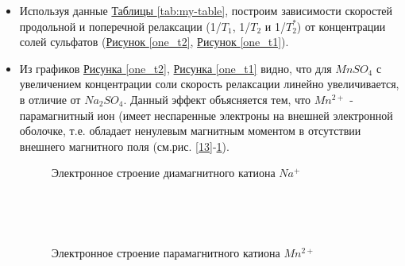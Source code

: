 \documentclass{article}
\begin{document}
\begin{itemize}
\item  Используя данные \hyperref[tab:my-table]{Таблицы \ref*{tab:my-table}}, построим зависимости скоростей продольной и поперечной релаксации (1/$T_1$, 1/$T_2$ и 1/$T_2^*$) от концентрации солей сульфатов (\hyperref[one_t2]{Рисунок \ref*{one_t2}}, \hyperref[one_t1]{Рисунок \ref*{one_t1}}).




\item
Из графиков \hyperref[one_t2]{Рисунка \ref*{one_t2}}, \hyperref[one_t1]{Рисунка \ref*{one_t1}} видно, что для $MnSO_4$ с увеличением концентрации соли скорость релаксации линейно увеличивается, в отличие от $Na_2SO_4$. Данный эффект объясняется тем, что $Mn^{2+}$ - парамагнитный ион (имеет неспаренные электроны на внешней электронной оболочке, т.е. обладает ненулевым магнитным моментом в отсутствии внешнего магнитного поля (см.рис. \ref{13}-\ref{14}).

\begin{figure}[h!]
\begin{minipage}[h]{0.5\linewidth}
 \caption{ Электронное строение диамагнитного катиона $Na^+$} \label{13} \\
\end{minipage}
\hfill
\begin{minipage}[h]{0.5\linewidth}
 \caption{Электронное строение парамагнитного катиона $Mn^{2+}$} \label{14} \\
\end{minipage}
\end{figure} 




\end{itemize}
\end{document}
